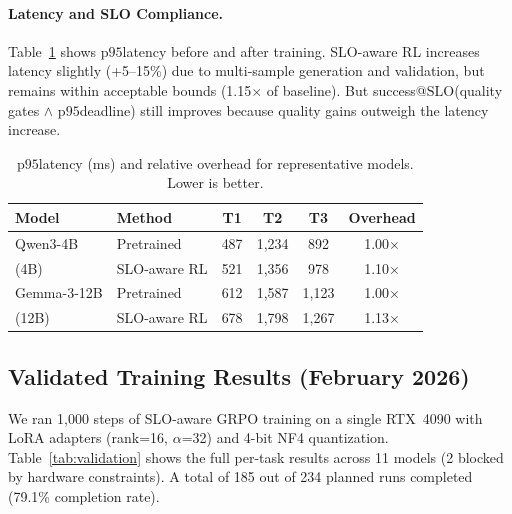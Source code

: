 \documentclass[11pt]{article}
\newcommand{\pninetyfive}{\ensuremath{\mathrm{p95}}}
\newcommand{\slo}{\ensuremath{\mathrm{SLO}}}
\begin{document}
\paragraph{Latency and SLO Compliance.}
Table~\ref{tab:latency} shows \pninetyfive latency before and after training.
SLO-aware RL increases latency slightly (+5--15\%) due to multi-sample generation and validation, but remains within acceptable bounds (1.15$\times$ of baseline).
But success@\slo (quality gates $\wedge$ \pninetyfive deadline) still improves because quality gains outweigh the latency increase.

\begin{table}[t]
\centering
\caption{\pninetyfive latency (ms) and relative overhead for representative models.  Lower is better.}
\label{tab:latency}
\begin{tabular}{l l ccc c}
\toprule
\textbf{Model} & \textbf{Method} & \textbf{T1} & \textbf{T2} & \textbf{T3} & \textbf{Overhead} \\
\midrule
Qwen3-4B & Pretrained & 487 & 1{,}234 & 892 & 1.00$\times$ \\
(4B) & SLO-aware RL & 521 & 1{,}356 & 978 & 1.10$\times$ \\
\midrule
Gemma-3-12B & Pretrained & 612 & 1{,}587 & 1{,}123 & 1.00$\times$ \\
(12B) & SLO-aware RL & 678 & 1{,}798 & 1{,}267 & 1.13$\times$ \\
\bottomrule
\end{tabular}
\end{table}

\subsection{Validated Training Results (February 2026)}

We ran 1{,}000 steps of SLO-aware GRPO training on a single RTX~4090 with LoRA adapters (rank=16, $\alpha$=32) and 4-bit NF4 quantization.
Table~\ref{tab:validation} shows the full per-task results across 11 models (2 blocked by hardware constraints).
A total of 185 out of 234 planned runs completed (79.1\% completion rate).
\end{document}
